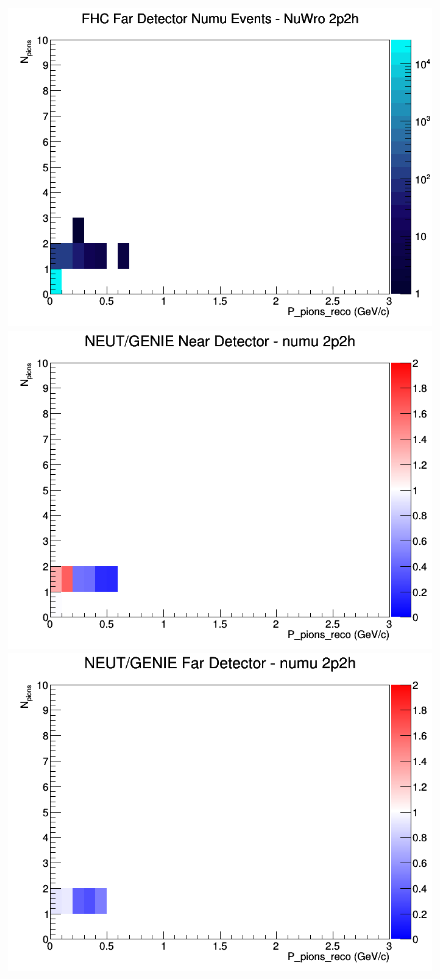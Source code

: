 \documentclass[12pt]{article}
\begin{document}
\begin{figure}[h]
\endminipage
{}
\includegraphics[width=\linewidth]{eff_N_P/GAr/pions/2p2h_FHC_FD_numu_N_P_NuWro.png}
\endminipage
\newline
{}
\includegraphics[width=\linewidth]{eff_N_P/GAr/pions/ratios/2p2h_NEUT_GENIE_numu_near_N_P.png}
\endminipage
{}
\includegraphics[width=\linewidth]{eff_N_P/GAr/pions/ratios/2p2h_NEUT_GENIE_numu_far_N_P.png}

\end{figure}
\end{document}
